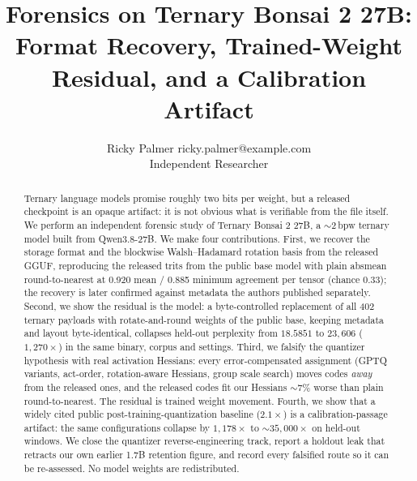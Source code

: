 \documentclass[10pt]{article}
\title{Forensics on Ternary Bonsai 2 27B: Format Recovery, Trained-Weight Residual, and a Calibration Artifact}
\author{\name Ricky Palmer \email ricky.palmer@example.com \\
      \addr Independent Researcher}
\begin{document}
\maketitle

\begin{abstract}
Ternary language models promise roughly two bits per weight, but a released
checkpoint is an opaque artifact: it is not obvious what is verifiable from the
file itself. We perform an independent forensic study of Ternary Bonsai 2 27B,
a $\sim$2\,bpw ternary model built from Qwen3.8-27B. We make four
contributions. First, we recover the storage format and the blockwise
Walsh--Hadamard rotation basis from the released GGUF, reproducing the released
trits from the public base model with plain absmean round-to-nearest at
0.920 mean / 0.885 minimum agreement per tensor (chance 0.33); the recovery is
later confirmed against metadata the authors published separately. Second, we
show the residual is the model: a byte-controlled replacement of all 402 ternary
payloads with rotate-and-round weights of the public base, keeping metadata and
layout byte-identical, collapses held-out perplexity from $18.5851$ to
$23{,}606$ ($1{,}270\times$) in the same binary, corpus and settings. Third, we
falsify the quantizer hypothesis with real activation Hessians: every
error-compensated assignment (GPTQ variants, act-order, rotation-aware
Hessians, group scale search) moves codes \emph{away} from the released ones,
and the released codes fit our Hessians $\sim$7\% worse than plain
round-to-nearest. The residual is trained weight movement. Fourth, we show that
a widely cited public post-training-quantization baseline ($2.1\times$) is a
calibration-passage artifact: the same configurations collapse by
$1{,}178\times$ to $\sim$$35{,}000\times$ on held-out windows. We close the
quantizer reverse-engineering track, report a holdout leak that retracts our own
earlier 1.7B retention figure, and record every falsified route so it can be
re-assessed. No model weights are redistributed.
\end{abstract}
















\appendix

\end{document}
